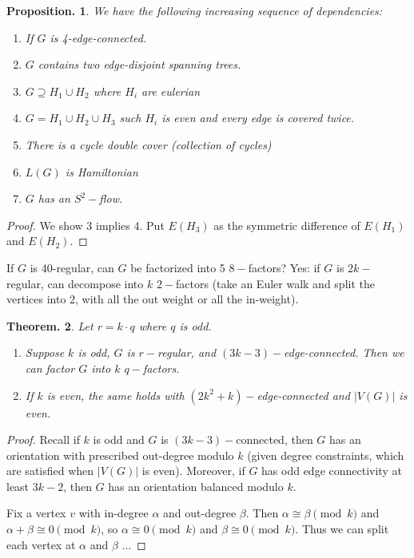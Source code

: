 \documentclass[11pt, a4paper]{memoir}
\theoremstyle{change}
\newtheorem{theorem}{Theorem.}[section]
\newtheorem{proposition}[theorem]{Proposition.}
\theoremstyle{plain}
\theoremstyle{nonumberplain}
\newtheorem{proof}{Proof}
\numberwithin{equation}{section}
\begin{document}
\begin{proposition}
    We have the following increasing sequence of dependencies:
    \begin{enumerate}[nl]
        \item If $G$ is 4-edge-connected.
        \item $G$ contains two edge-disjoint spanning trees.
        \item $G\supseteq H_1\cup H_2$ where $H_i$ are eulerian
        \item $G=H_1\cup H_2\cup H_3$ such $H_i$ is even and every edge is covered twice.
        \item There is a cycle double cover (collection of cycles)
        \item $L(G)$ is Hamiltonian
        \item $G$ has an $S^2-$flow.
    \end{enumerate}
\end{proposition}
\begin{proof}
    We show 3 implies 4.
    Put $E(H_3)$ as the symmetric difference of $E(H_1)$ and $E(H_2)$.
\end{proof}
If $G$ is 40-regular, can $G$ be factorized into 5 $8-$factors?
Yes: if $G$ is $2k-$regular, can decompose into $k$ $2-$factors (take an Euler walk and split the vertices into 2, with all the out weight or all the in-weight).
\begin{theorem}
    Let $r=k\cdot q$ where $q$ is odd.
    \begin{enumerate}[nl,r]
        \item Suppose $k$ is odd, $G$ is $r-$regular, and $(3k-3)-$edge-connected.
            Then we can factor $G$ into $k$ $q-$factors.
        \item If $k$ is even, the same holds with $(2k^2+k)-$edge-connected and $|V(G)|$ is even.
    \end{enumerate}
\end{theorem}
\begin{proof}
    Recall if $k$ is odd and $G$ is $(3k-3)-$connected, then $G$ has an orientation with prescribed out-degree modulo $k$ (given degree constraints, which are satisfied when $|V(G)|$ is even).
    Moreover, if $G$ has odd edge connectivity at least $3k-2$, then $G$ has an orientation balanced modulo $k$.

    Fix a vertex $v$ with in-degree $\alpha$ and out-degree $\beta$.
    Then $\alpha\cong\beta\pmod{k}$ and $\alpha+\beta\cong 0\pmod{k}$, so $\alpha\cong 0\pmod{k}$ and $\beta\cong 0\pmod{k}$.
    Thus we can split each vertex at $\alpha$ and $\beta$ ...
\end{proof}
\end{document}
